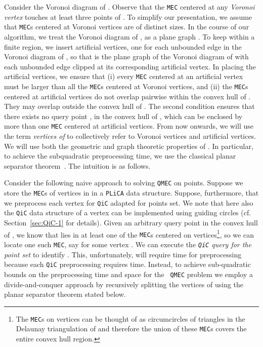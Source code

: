 \documentclass[12pt]{llncs}
\begin{document}
Consider the Voronoi diagram of . Observe that the {\tt MEC} centered at 
any {\it Voronoi vertex} touches at least three points of . To simplify 
our presentation, we assume  that {\tt MEC}s 
centered at Voronoi vertices are of distinct sizes. 
In the course of our algorithm, we  treat the Voronoi diagram of , as a 
plane graph  . To keep  within a finite region, we  insert artificial vertices,
one for each unbounded edge in the Voronoi diagram 
of ,  so that  is the plane graph of the Voronoi diagram of  with each 
unbounded edge clipped at 
its corresponding artificial vertex. In placing the artificial vertices, we ensure that 
(i) every {\tt MEC} centered at an artificial vertex 
must be larger than all the {\tt MEC}s centered at Voronoi vertices, and 
(ii) 
the {\tt MEC}s centered at artificial vertices do not overlap pairwise within 
the convex hull of . They may overlap outside the convex hull of .
The second condition ensures that there exists no query point , in the convex hull 
of ,
which can be enclosed by more than one {\tt MEC} centered at artificial vertices.
From now onwards, we will use the term {\em vertices of } to collectively refer 
to Voronoi vertices and artificial vertices. We will use both the geometric and 
graph theoretic properties of . In particular, to achieve the subquadratic 
preprocessing time, we use the classical planar separator theorem\ \cite{LT79}. The intuition is as follows.


Consider the following naive approach to solving {\tt QMEC} on points.
Suppose we store the {\tt MEC}s of vertices in  in a {\tt PLiCA} data structure. Suppose, furthermore, that we preprocess each vertex for {\tt QiC} adapted for points set. We note that
here also the {\tt QiC} data structure of a vertex can be implemented using 
guiding circles (cf. Section\ \ref{sec:QiC-1} for details).
Given an arbitrary query point  in 
the convex hull of , we know that  lies in at least one of the {\tt MEC}s centered on vertices\footnote{The {\tt MEC}s on vertices can be thought of as circumcircles of triangles in the Delaunay triangulation of  and therefore the union of these {\tt MEC}s covers the entire convex hull region.}, 
so we can locate one such {\tt MEC}, say  for some vertex . We can
execute the {\it {\tt QiC} query for the point set} to identify .  This, unfortunately, will require  time for preprocessing because each {\tt QiC} preprocessing requires  time. Instead, to achieve sub-quadratic bounds on the preprocessing time and space for the {\tt 
QMEC} problem we employ a divide-and-conquer approach
by recursively splitting the vertices of  using the planar separator theorem 
 stated below.
\end{document}
